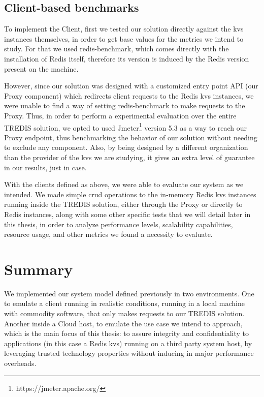 \subsection{Client-based benchmarks}

To implement the Client, first we tested our solution directly against the \gls{kvs} instances themselves, in order to get base values for the metrics we intend to study. For that we used redis-benchmark, which comes directly with the installation of Redis itself, therefore its version is induced by the Redis version present on the machine.

However, since our solution was designed with a customized entry point API (our Proxy component) which redirects client requests to the Redis \gls{kvs} instances, we were unable to find a way of setting redis-benchmark to make requests to the Proxy. 
Thus, in order to perform a experimental evaluation over the entire TREDIS solution, we opted to used Jmeter\footnote{https://jmeter.apache.org/} version 5.3 as a way to reach our Proxy endpoint, thus benchmarking the behavior of our solution without needing to exclude any component. Also, by being designed by a different organization than the provider of the \gls{kvs} we are studying, it gives an extra level of guarantee in our results, just in case.

With the clients defined as above, we were able to evaluate our system as we intended. 
We made simple \gls{crud} operations to the in-memory Redis \gls{kvs} instances running inside the TREDIS solution, either through the Proxy or directly to Redis instances, along with some other specific tests that we will detail later in this thesis, in order to analyze performance levels, scalability capabilities, resource usage, and other metrics we found a necessity to evaluate.



\section{Summary}
\label{sec:implementationSummary}

We implemented our system model defined previously in two environments. 
One to emulate a client running in realistic conditions, running in a local machine with commodity software, that only makes requests to our TREDIS solution. Another inside a Cloud host, to emulate the use case we intend to approach, which is the main focus of this thesis: to assure integrity and confidentiality to applications (in this case a Redis \gls{kvs}) running on a third party system host, by leveraging trusted technology properties without inducing in major performance overheads.

